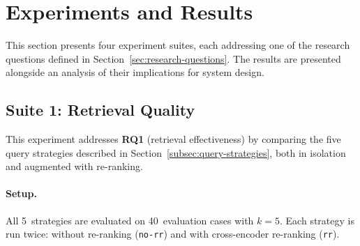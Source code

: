 \section{Experiments and Results}
\label{sec:experiments}

This section presents four experiment suites, each addressing one of the research questions defined in Section~\ref{sec:research-questions}. The results are presented alongside an analysis of their implications for system design.

\subsection{Suite 1: Retrieval Quality}
\label{subsec:suite1}

This experiment addresses \textbf{RQ1} (retrieval effectiveness) by comparing the five query strategies described in Section~\ref{subsec:query-strategies}, both in isolation and augmented with re-ranking.

\paragraph{Setup.} All 5~strategies are evaluated on 40~evaluation cases with $k{=}5$. Each strategy is run twice: without re-ranking (\texttt{no-rr}) and with cross-encoder re-ranking (\texttt{rr}).

\begin{table}[!ht]
\centering
\small
\renewcommand{\arraystretch}{1.3}
\caption[Retrieval quality.]{Retrieval quality across the five query strategies, with and without cross-encoder re-ranking.}
\label{tab:retrieval-results}
\end{table}

